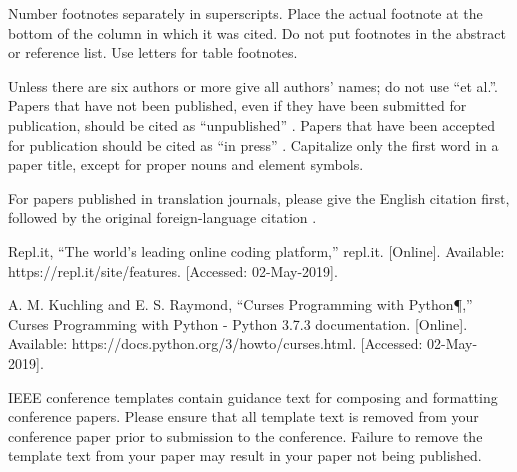 \documentclass[conference]{IEEEtran}
\begin{document}
Number footnotes separately in superscripts. Place the actual footnote at 
the bottom of the column in which it was cited. Do not put footnotes in the 
abstract or reference list. Use letters for table footnotes.

Unless there are six authors or more give all authors' names; do not use 
``et al.''. Papers that have not been published, even if they have been 
submitted for publication, should be cited as ``unpublished'' \cite{b4}. Papers 
that have been accepted for publication should be cited as ``in press'' \cite{b5}. 
Capitalize only the first word in a paper title, except for proper nouns and 
element symbols.

For papers published in translation journals, please give the English 
citation first, followed by the original foreign-language citation \cite{b6}.

\begin{thebibliography}{00}
 Repl.it, “The world's leading online coding platform,” repl.it. [Online]. Available: https://repl.it/site/features. [Accessed: 02-May-2019].

 A. M. Kuchling and E. S. Raymond, “Curses Programming with Python¶,” Curses Programming with Python - Python 3.7.3 documentation. [Online]. Available: https://docs.python.org/3/howto/curses.html. [Accessed: 02-May-2019].

\end{thebibliography}
\vspace{12pt}
\color{red}
IEEE conference templates contain guidance text for composing and formatting conference papers. Please ensure that all template text is removed from your conference paper prior to submission to the conference. Failure to remove the template text from your paper may result in your paper not being published.
\end{document}
